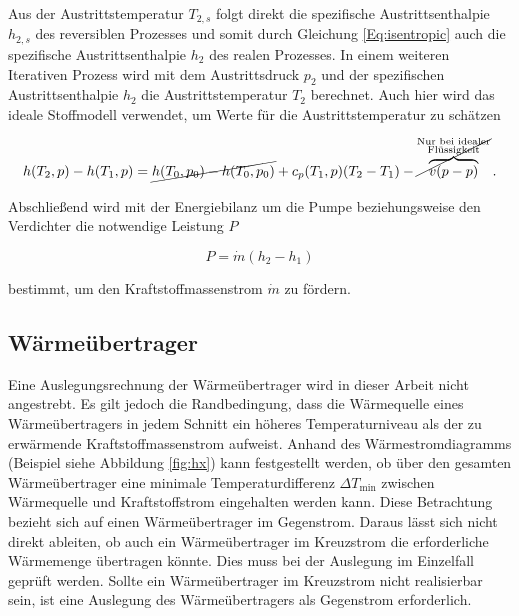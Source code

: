 Aus der Austrittstemperatur $T_{2,s}$ folgt direkt die spezifische Austrittsenthalpie $h_{2,s}$ des reversiblen Prozesses und somit durch Gleichung \ref{Eq:isentropic} auch die spezifische Austrittsenthalpie $h_2$ des realen Prozesses. In einem weiteren Iterativen Prozess wird mit dem Austrittsdruck $p_2$ und der spezifischen Austrittsenthalpie $h_2$ die Austrittstemperatur $T_2$ berechnet. Auch hier wird das ideale Stoffmodell verwendet, um Werte für die Austrittstemperatur zu schätzen

\begin{equation}\label{Eq:enthalpy}
	h(T_2,p)-h(T_1,p)=\cancel{h(T_0,p_0) - h(T_0,p_0)} + c_p(T_1,p)(T_2 - T_1) - {\cancel{\overbrace{v(p-p)}^{\substack{\text{Nur bei idealer} \\ \text{Flüssigkeit}}}}}\,.
\end{equation}

Abschließend wird mit der Energiebilanz um die Pumpe beziehungsweise den Verdichter die notwendige Leistung $P$ 

\begin{equation}\label{Eq:power}
	P=\dot{m}(h_2-h_1)
\end{equation}

bestimmt, um den Kraftstoffmassenstrom $\dot{m}$ zu fördern.

\subsection{Wärmeübertrager}

Eine Auslegungsrechnung der Wärmeübertrager wird in dieser Arbeit nicht angestrebt. Es gilt jedoch die Randbedingung, dass die Wärmequelle eines Wärmeübertragers in jedem Schnitt ein höheres Temperaturniveau als der zu erwärmende Kraftstoffmassenstrom aufweist. Anhand des Wärmestromdiagramms (Beispiel siehe Abbildung \ref{fig:hx}) kann festgestellt werden, ob über den gesamten Wärmeübertrager eine minimale Temperaturdifferenz $\Delta T_\mathrm{min}$ zwischen Wärmequelle und Kraftstoffstrom eingehalten werden kann. Diese Betrachtung bezieht sich auf einen Wärmeübertrager im Gegenstrom. Daraus lässt sich nicht direkt ableiten, ob auch ein Wärmeübertrager im Kreuzstrom die erforderliche Wärmemenge übertragen könnte. Dies muss bei der Auslegung im Einzelfall geprüft werden. Sollte ein Wärmeübertrager im Kreuzstrom nicht realisierbar sein, ist eine Auslegung des Wärmeübertragers als Gegenstrom erforderlich.


